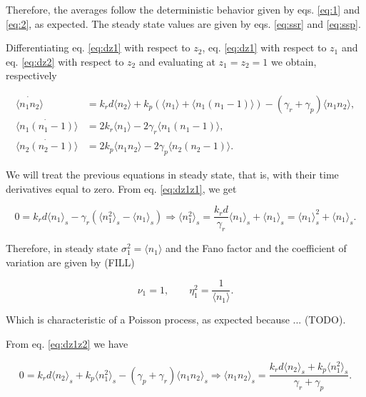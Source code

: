 Therefore, the averages follow the deterministic behavior given by eqs. \ref{eq:1} and \ref{eq:2}, as expected. The steady state values are given by eqs. \ref{eq:ssr} and \ref{eq:ssp}.

Differentiating eq. \ref{eq:dz1} with respect to $z_2$, eq. \ref{eq:dz1} with respect to $z_1$ and eq. \ref{eq:dz2} with respect to $z_2$ and evaluating at $z_1 = z_2 = 1$ we obtain, respectively

\begin{align}
\dot{\langle n_1n_2\rangle} &= k_rd\langle n_2 \rangle + k_p\left(\langle n_1\rangle + \langle n_1(n_1-1) \rangle \right) - \left( \gamma_r + \gamma_p \right)\langle n_1n_2 \rangle,\label{eq:dz1z2}\\
\dot{\langle n_1(n_1-1)\rangle} &= 2k_r\langle n_1\rangle-2\gamma_r\langle n_1(n_1-1) \rangle, \label{eq:dz1z1}\\
\dot{\langle n_2(n_2-1)\rangle} &= 2k_p\langle n_1n_2 \rangle - 2\gamma_p\langle n_2(n_2-1)\rangle. \label{eq:dz2z2}
\end{align}

We will treat the previous equations in steady state, that is, with their time derivatives equal to zero. From  eq. \ref{eq:dz1z1}, we get

\begin{equation}
\label{eq:pren1}
0 = k_rd \langle n_1 \rangle_s -\gamma_r \left(\langle n_1^2 \rangle_s - \langle n_1 \rangle_s \right) \Rightarrow \langle n_1^2 \rangle_s = \frac{k_rd}{\gamma_r}\langle n_1 \rangle_s + \langle n_1 \rangle_s = \langle n_1 \rangle_s^2 + \langle n_1 \rangle_s.
\end{equation}

Therefore, in steady state $\sigma_1^2 = \langle n_1 \rangle$ and the Fano factor and the coefficient of variation are given by (FILL)

\begin{equation}
\label{noise1}
\boxed{\nu_1 = 1}, \quad\quad \boxed{\eta_1^2 = \frac{1}{\langle n_1 \rangle}}.
\end{equation}

Which is characteristic of a Poisson process, as expected because ... (TODO).

From eq. \ref{eq:dz1z2} we have

\begin{equation*}
0 = k_rd \langle n_2 \rangle_s + k_p \langle n_1^2 \rangle_s - (\gamma_p + \gamma_r) \langle n_1n_2 \rangle_s \Rightarrow \langle n_1n_2 \rangle_s  = \frac{k_rd\langle n_2\rangle_s+k_p\langle n_1^2\rangle_s}{\gamma_r+\gamma_p}.
\end{equation*}

